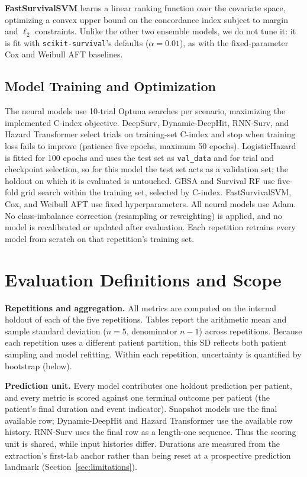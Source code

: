 \textbf{FastSurvivalSVM} learns a linear ranking function over the covariate space, optimizing a convex upper bound on the concordance index subject to margin and $\ell_2$ constraints. Unlike the other two ensemble models, we do not tune it: it is fit with \texttt{scikit-survival}'s defaults ($\alpha=0.01$), as with the fixed-parameter Cox and Weibull AFT baselines.

\subsection{Model Training and Optimization}\label{app:training}
The neural models use 10-trial Optuna searches per scenario, maximizing the implemented C-index objective. DeepSurv, Dynamic-DeepHit, RNN-Surv, and Hazard Transformer select trials on training-set C-index and stop when training loss fails to improve (patience five epochs, maximum 50 epochs). LogisticHazard is fitted for 100 epochs and uses the test set as \texttt{val\_data} and for trial and checkpoint selection, so for this model the test set acts as a validation set; the holdout on which it is evaluated is untouched. GBSA and Survival RF use five-fold grid search within the training set, selected by C-index. FastSurvivalSVM, Cox, and Weibull AFT use fixed hyperparameters. All neural models use Adam. No class-imbalance correction (resampling or reweighting) is applied, and no model is recalibrated or updated after evaluation. Each repetition retrains every model from scratch on that repetition's training set.

\section{Evaluation Definitions and Scope} \label{app:evaluation}

\textbf{Repetitions and aggregation.} All metrics are computed on the internal holdout of each of the five repetitions. Tables report the arithmetic mean and sample standard deviation ($n=5$, denominator $n-1$) across repetitions. Because each repetition uses a different patient partition, this SD reflects both patient sampling and model refitting. Within each repetition, uncertainty is quantified by bootstrap (below).

\textbf{Prediction unit.} Every model contributes one holdout prediction per patient, and every metric is scored against one terminal outcome per patient (the patient's final duration and event indicator). Snapshot models use the final available row; Dynamic-DeepHit and Hazard Transformer use the available row history. RNN-Surv uses the final row as a length-one sequence. Thus the scoring unit is shared, while input histories differ. Durations are measured from the extraction's first-lab anchor rather than being reset at a prospective prediction landmark (Section~\ref{sec:limitations}).


